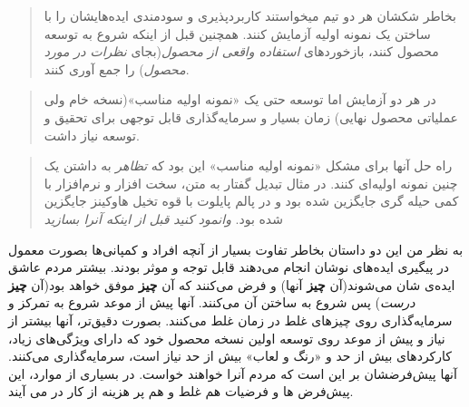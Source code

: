 \begin{quote}
بخاطر شکشان هر دو تیم میخواستند کاربردپذیری و سودمندی ایده‌هایشان را با
ساختن یک نمونه اولیه آزمایش کنند. همچنین قبل از اینکه شروع به توسعه
محصول کنند، بازخوردهای \emph{استفاده واقعی از محصول}(بجای \emph{نظرات در
مورد محصول}) را جمع آوری کنند.
\end{quote}

\begin{quote}
در هر دو آزمایش اما توسعه حتی یک «نمونه اولیه مناسب»(نسخه خام ولی
عملیاتی محصول نهایی) زمان بسیار و سرمایه‌گذاری قابل توجهی برای تحقیق و
توسعه نیاز داشت.
\end{quote}

\begin{quote}
راه حل آنها برای مشکل «نمونه اولیه مناسب» این بود که \emph{تظاهر} به
داشتن یک چنین نمونه اولیه‌ای کنند. در مثال تبدیل گفتار به متن، سخت افزار
و نرم‌افزار با کمی حیله گری جایگزین شده بود و در پالم پایلوت با قوه تخیل
هاوکینز جایگزین شده بود. \emph{وانمود کنید قبل از اینکه آنرا بسازید}
\end{quote}

به نظر من این دو داستان بخاطر تفاوت بسیار از آنچه افراد و کمپانی‌ها
بصورت معمول در پیگیری ایده‌های نوشان انجام می‌دهند قابل توجه و موثر
بودند. بیشتر مردم عاشق ایده‌ی شان می‌شوند(آن \textbf{چیز} آنها) و فرض
می‌کنند که آن \textbf{چیز} موفق خواهد بود(آن \textbf{چیز} \emph{درست})
پس شروع به ساختن آن می‌کنند. آنها پیش از موعد شروع به تمرکز و
سرمایه‌گذاری روی چیزهای غلط در زمان غلط می‌کنند. بصورت دقیق‌تر، آنها
بیشتر از نیاز و پیش از موعد روی توسعه اولین نسخه محصول خود که دارای
ویژگی‌های زیاد، کارکردهای بیش از حد و «رنگ و لعاب» بیش از حد نیاز است،
سرمایه‌گذاری می‌کنند. آنها پیش‌فرضشان بر این است که مردم آنرا خواهند
خواست. در بسیاری از موارد، این پیش‌فرض ها و فرضیات هم غلط و هم پر هزینه
از کار در می آیند.
